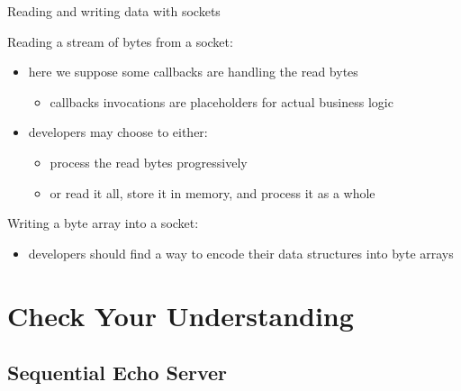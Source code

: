 \documentclass{beamer}\mode<presentation>{\usetheme{AMSBolognaFC}}
\begin{document}
\begin{frame}[c, allowframebreaks]{Reading and writing data with sockets}

    Reading a \alert{stream of bytes} from a socket:
    
    \begin{itemize}
        \item here we suppose some callbacks are handling the read bytes
        \begin{itemize}
            \item callbacks invocations are placeholders for actual business logic
        \end{itemize}

        \item developers may choose to either:
        \begin{itemize}
            \item process the read bytes progressively
            \item or read it all, store it in memory, and process it as a whole
        \end{itemize}
    \end{itemize}

    \framebreak

    Writing a \alert{byte array} into a socket:
    
    \begin{itemize}
        \item developers should find a way to encode their data structures into byte arrays
    \end{itemize}

\end{frame}

\section{Check Your Understanding}

\subsection{Sequential Echo Server}
\end{document}
